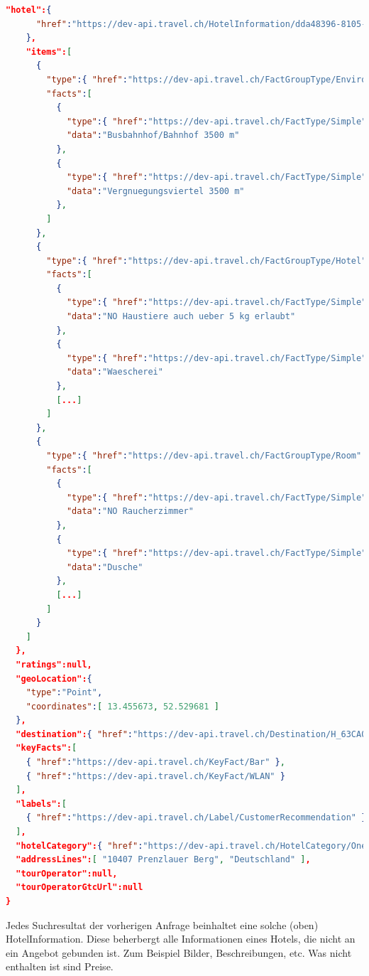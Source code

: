 \begin{lstlisting}[language=json,firstnumber=1]
    "hotel":{
      "href":"https://dev-api.travel.ch/HotelInformation/dda48396-8105-433d-b75b-668f96ec89d8"
    },
    "items":[
      {
        "type":{ "href":"https://dev-api.travel.ch/FactGroupType/Environment" },
        "facts":[
          {
            "type":{ "href":"https://dev-api.travel.ch/FactType/Simple" },
            "data":"Busbahnhof/Bahnhof 3500 m"
          },
          {
            "type":{ "href":"https://dev-api.travel.ch/FactType/Simple" },
            "data":"Vergnuegungsviertel 3500 m"
          },
        ]
      },
      {
        "type":{ "href":"https://dev-api.travel.ch/FactGroupType/Hotel" },
        "facts":[
          {
            "type":{ "href":"https://dev-api.travel.ch/FactType/Simple" },
            "data":"NO Haustiere auch ueber 5 kg erlaubt"
          },
          {
            "type":{ "href":"https://dev-api.travel.ch/FactType/Simple" },
            "data":"Waescherei"
          },
          [...]
        ]
      },
      {
        "type":{ "href":"https://dev-api.travel.ch/FactGroupType/Room" },
        "facts":[
          {
            "type":{ "href":"https://dev-api.travel.ch/FactType/Simple" },
            "data":"NO Raucherzimmer"
          },
          {
            "type":{ "href":"https://dev-api.travel.ch/FactType/Simple" },
            "data":"Dusche"
          },
          [...]
        ]
      }
    ]
  },
  "ratings":null,
  "geoLocation":{
    "type":"Point",
    "coordinates":[ 13.455673, 52.529681 ]
  },
  "destination":{ "href":"https://dev-api.travel.ch/Destination/H_63CA0931EAD8A33EF988144360A8056C" },
  "keyFacts":[
    { "href":"https://dev-api.travel.ch/KeyFact/Bar" },
    { "href":"https://dev-api.travel.ch/KeyFact/WLAN" }
  ],
  "labels":[
    { "href":"https://dev-api.travel.ch/Label/CustomerRecommendation" }
  ],
  "hotelCategory":{ "href":"https://dev-api.travel.ch/HotelCategory/One" },
  "addressLines":[ "10407 Prenzlauer Berg", "Deutschland" ],
  "tourOperator":null,
  "tourOperatorGtcUrl":null
}
\end{lstlisting}
Jedes Suchresultat der vorherigen Anfrage beinhaltet eine solche (oben) HotelInformation. Diese beherbergt alle Informationen eines Hotels, die nicht an ein Angebot gebunden ist. Zum Beispiel Bilder, Beschreibungen, etc. Was nicht enthalten ist sind Preise.



